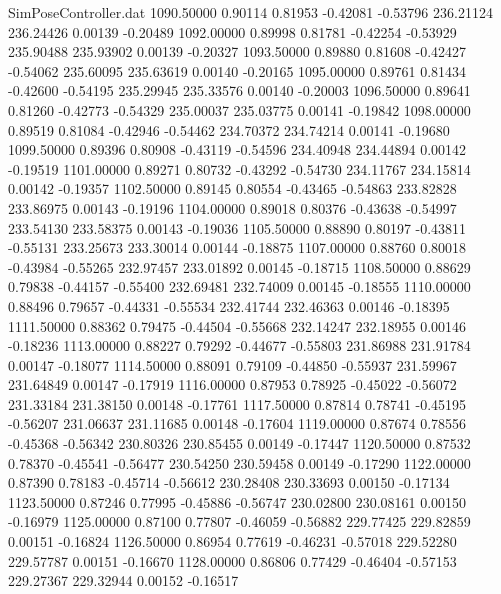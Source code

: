 \begin{filecontents}{SimPoseController.dat}
1090.50000    0.90114    0.81953    -0.42081   -0.53796  236.21124  236.24426    0.00139   -0.20489
1092.00000    0.89998    0.81781    -0.42254   -0.53929  235.90488  235.93902    0.00139   -0.20327
1093.50000    0.89880    0.81608    -0.42427   -0.54062  235.60095  235.63619    0.00140   -0.20165
1095.00000    0.89761    0.81434    -0.42600   -0.54195  235.29945  235.33576    0.00140   -0.20003
1096.50000    0.89641    0.81260    -0.42773   -0.54329  235.00037  235.03775    0.00141   -0.19842
1098.00000    0.89519    0.81084    -0.42946   -0.54462  234.70372  234.74214    0.00141   -0.19680
1099.50000    0.89396    0.80908    -0.43119   -0.54596  234.40948  234.44894    0.00142   -0.19519
1101.00000    0.89271    0.80732    -0.43292   -0.54730  234.11767  234.15814    0.00142   -0.19357
1102.50000    0.89145    0.80554    -0.43465   -0.54863  233.82828  233.86975    0.00143   -0.19196
1104.00000    0.89018    0.80376    -0.43638   -0.54997  233.54130  233.58375    0.00143   -0.19036
1105.50000    0.88890    0.80197    -0.43811   -0.55131  233.25673  233.30014    0.00144   -0.18875
1107.00000    0.88760    0.80018    -0.43984   -0.55265  232.97457  233.01892    0.00145   -0.18715
1108.50000    0.88629    0.79838    -0.44157   -0.55400  232.69481  232.74009    0.00145   -0.18555
1110.00000    0.88496    0.79657    -0.44331   -0.55534  232.41744  232.46363    0.00146   -0.18395
1111.50000    0.88362    0.79475    -0.44504   -0.55668  232.14247  232.18955    0.00146   -0.18236
1113.00000    0.88227    0.79292    -0.44677   -0.55803  231.86988  231.91784    0.00147   -0.18077
1114.50000    0.88091    0.79109    -0.44850   -0.55937  231.59967  231.64849    0.00147   -0.17919
1116.00000    0.87953    0.78925    -0.45022   -0.56072  231.33184  231.38150    0.00148   -0.17761
1117.50000    0.87814    0.78741    -0.45195   -0.56207  231.06637  231.11685    0.00148   -0.17604
1119.00000    0.87674    0.78556    -0.45368   -0.56342  230.80326  230.85455    0.00149   -0.17447
1120.50000    0.87532    0.78370    -0.45541   -0.56477  230.54250  230.59458    0.00149   -0.17290
1122.00000    0.87390    0.78183    -0.45714   -0.56612  230.28408  230.33693    0.00150   -0.17134
1123.50000    0.87246    0.77995    -0.45886   -0.56747  230.02800  230.08161    0.00150   -0.16979
1125.00000    0.87100    0.77807    -0.46059   -0.56882  229.77425  229.82859    0.00151   -0.16824
1126.50000    0.86954    0.77619    -0.46231   -0.57018  229.52280  229.57787    0.00151   -0.16670
1128.00000    0.86806    0.77429    -0.46404   -0.57153  229.27367  229.32944    0.00152   -0.16517

\end{filecontents}
